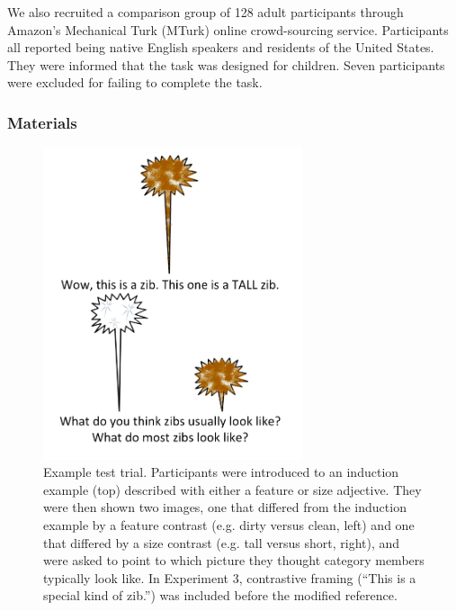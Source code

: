 \documentclass[man]{apa2}
\begin{document}


We also recruited a comparison group of 128 adult participants through Amazon's Mechanical Turk (MTurk) online crowd-sourcing service.  Participants all reported being native English speakers and residents of the United States. They were informed that the task was designed for children. Seven participants were excluded for failing to complete the task.  


\subsubsection{Materials}

\begin{figure}[t]
  \begin{center} 
    \includegraphics[width=3in]{figures/zib_demo.png} 
    \caption{\label{fig:inanimate_demo} Example test trial. Participants were introduced to an induction example (top) described with either a feature or size adjective. They were then shown two images, one that differed from the induction example by a feature contrast (e.g. dirty versus clean, left) and one that differed by a size contrast (e.g. tall versus short, right), and were asked to point to which picture they thought category members typically look like. In Experiment 3, contrastive framing (``This is a special kind of zib.'') was included before the modified reference. } 
  \end{center} 
\vspace{-10ex}
\end{figure}	
\end{document}
